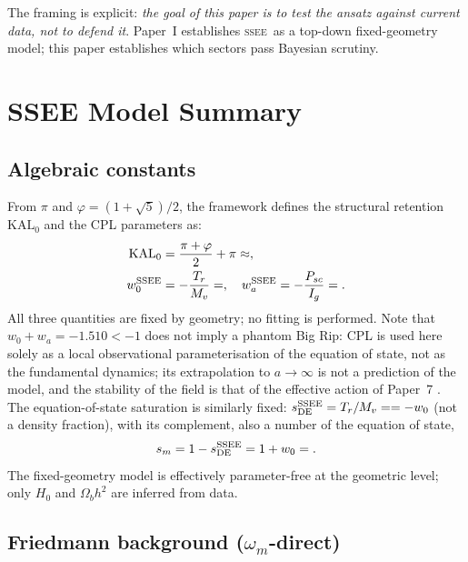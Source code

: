 \documentclass[12pt,a4paper]{article}
\newcommand{\SSEE}{\ifmmode\mathrm{SSEE}\else\textsc{ssee}\fi}
\newcommand{\KALz}{\mathrm{KAL}_0}
\newcommand{\wz}{w_0}
\newcommand{\wa}{w_a}
\begin{document}
The framing is explicit: \textit{the goal of this paper is to test the
ansatz against current data, not to defend it}. Paper~I establishes
\SSEE\ as a top-down fixed-geometry model; this paper establishes which
sectors pass Bayesian scrutiny.

\section{SSEE Model Summary}
\label{sec:model}

\subsection{Algebraic constants}

From $\pi$ and $\varphi=(1+\sqrt{5})/2$, the framework defines the
structural retention $\KALz$ and the CPL \citep{Chevallier2001,Linder2003} parameters as:
\begin{align}
  \KALz &= \frac{\pi+\varphi}{2}+\pi \approx \val{KAL0_d4}, \label{eq:kal0} \\
  \wz^{\SSEE} &= -\frac{T_r}{M_v}=\val{W0_d6}, \quad
  \wa^{\SSEE} = -\frac{P_{sc}}{I_g}=\val{WA_d6}.
  \label{eq:ssee_pars}
\end{align}
All three quantities are fixed by geometry; no fitting is performed.
Note that $\wz+\wa=-1.510<-1$ does not imply a phantom Big Rip: CPL is used
here solely as a local observational parameterisation of the equation of state,
not as the fundamental dynamics; its extrapolation to $a\to\infty$ is not a
prediction of the model, and the stability of the field is that of the
effective action of Paper~7 \citep{SSEE_paperI}.
The equation-of-state saturation is similarly fixed:
$s_{\rm DE}^{\SSEE}=T_r/M_v=\val{S_DE_d6}=-w_0$ (not a density fraction), with its
complement, also a number of the equation of state,
\begin{equation}
  s_m = 1-s_{\rm DE}^{\SSEE} = 1+w_0 = \val{S_M_d6}.
  \label{eq:om_eff}
\end{equation}
The fixed-geometry model is effectively parameter-free at the geometric
level; only $H_0$ and $\Omega_b h^2$ are inferred from data.

\subsection{Friedmann background ($\omega_m$-direct)}
\end{document}
